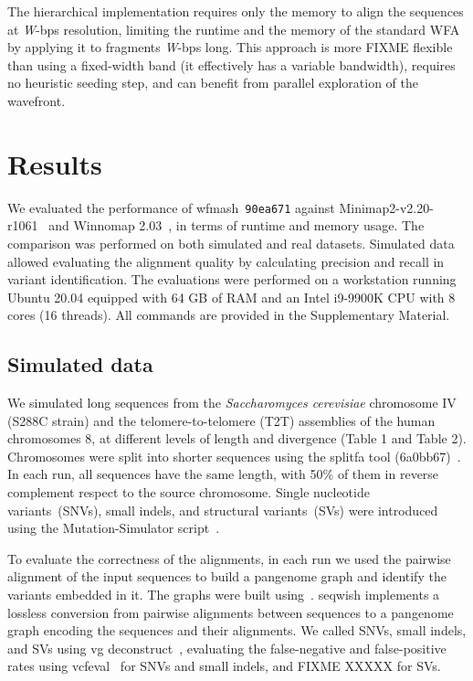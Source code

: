 \documentclass{bioinfo}
\newcommand{\wfmash}{wfmash}
\begin{document}
    The hierarchical implementation requires only the memory to align the sequences at \textit{W}-bps resolution,
    limiting the runtime and the memory of the standard WFA by applying it to fragments \textit{W}-bps long.
    This approach is more FIXME flexible than using a fixed-width band (it effectively has a variable bandwidth), requires
    no heuristic seeding step, and can benefit from parallel exploration of the wavefront.


    \section{Results}

    We evaluated the performance of \wfmash\ \texttt{90ea671} against Minimap2-v2.20-r1061~\citep{29750242} and
    Winnomap 2.03~\citep{XXX}, in terms of runtime and memory usage. The comparison was performed on both simulated
    and real datasets. Simulated data allowed evaluating the alignment quality by calculating precision and recall
    in variant identification. The evaluations were performed on a workstation running Ubuntu 20.04 equipped with
    64 GB of RAM and an Intel i9-9900K CPU with 8 cores (16 threads). All commands are provided in the Supplementary Material.

    \subsection{Simulated data}
    We simulated long sequences from the \textit{Saccharomyces cerevisiae} chromosome IV (S288C strain) and the
    telomere-to-telomere (T2T) assemblies of the human chromosomes 8, at different levels of length and divergence
    (Table 1 and Table 2). Chromosomes were split into shorter sequences using the splitfa tool (6a0bb67)~\citep{splitfa}.
    In each run, all sequences have the same length, with 50\% of them in reverse complement respect to the source
    chromosome. Single nucleotide variants~(SNVs), small indels, and structural variants~(SVs) were introduced
    using the Mutation-Simulator script~\citep{32780803}.

    To evaluate the correctness of the alignments, in each run we used the pairwise alignment of the input sequences to build
    a pangenome graph and identify the variants embedded in it. The graphs were built using~\citep{seqwish}.
    seqwish implements a lossless conversion from pairwise alignments between sequences to a pangenome graph encoding the
    sequences and their alignments. We called SNVs, small indels, and SVs using vg deconstruct~\citep{30125266},
    evaluating the false-negative and false-positive rates using vcfeval~\citep{vcfeval} for SNVs and small indels,
    and FIXME XXXXX for SVs.
\end{document}
